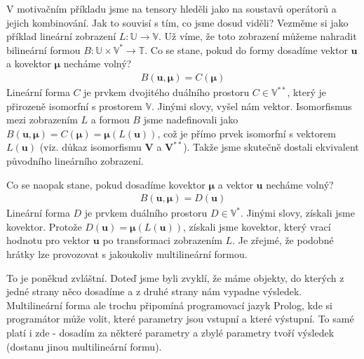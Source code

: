 \documentclass[a5paper,12pt]{amsbook}
\theoremstyle{definition}
\newcommand{\myvec}[1]{\bm{#1}}
\newcommand{\myspace}[1]{\mathbb{#1}}
\begin{document}
V motivačním příkladu jsme na tensory hleděli jako na soustavů operátorů a jejich
kombinování. Jak to souvisí s tím, co jsme dosud viděli? Vezměme si jako příklad
lineární zobrazení $L: \myspace{U}\rightarrow\myspace{V}$. Už víme, že toto zobrazení
můžeme nahradit bilineární formou $B: \myspace{U}\times\myspace{V^*}\rightarrow\myspace{T}$.
Co se stane, pokud do formy dosadíme vektor $\myvec{u}$ a kovektor $\myvec{\mu}$
necháme volný?
\begin{equation*}
\begin{split}
B(\myvec{u}, \myvec{\mu}) = C(\myvec{\mu})
\end{split}
\end{equation*}
Lineární forma $C$ je prvkem dvojitého duálního prostoru $C\in\myspace{V^{**}}$, který
je přirozeně isomorfní s prostorem $\myspace{V}$. Jinými slovy, vyšel nám vektor.
Isomorfismus mezi zobrazením $L$ a formou $B$ jsme nadefinovali jako
$B(\myvec{u}, \myvec{\mu}) = C(\myvec{\mu}) = \myvec{\mu}(L(\myvec{u}))$, což je přímo
prvek isomorfní s vektorem $L(\myvec{u})$ (viz. důkaz isomorfismu
$\myvec{V}$ a $\myvec{V^{**}}$). Takže jsme skutečně dostali ekvivalent původního
lineárního zobrazení.

Co se naopak stane, pokud dosadíme kovektor $\myvec{\mu}$ a vektor $\myvec{u}$ necháme
volný?
\begin{equation*}
\begin{split}
B(\myvec{u}, \myvec{\mu}) = D(\myvec{u})
\end{split}
\end{equation*}
Lineární forma $D$ je prvkem duálního prostoru $D\in\myspace{V^*}$. Jinými slovy,
získali jsme kovektor. Protože $D(\myvec{u}) = \myvec{\mu}(L(\myvec{u}))$,
získali jsme kovektor, který vrací hodnotu pro vektor $\myvec{u}$ po transformaci
zobrazením $L$. Je zřejmé, že podobné hrátky lze provozovat s jakoukoliv multilineární
formou.

To je poněkud zvláštní. Doteď jsme byli zvyklí, že máme objekty, do kterých z jedné
strany něco dosadíme a z druhé strany nám vypadne výsledek. Multilineární forma
ale trochu připomíná programovací jazyk Prolog, kde si programátor může volit,
které parametry jsou vstupní a které výstupní. To samé platí i zde - dosadím
za některé parametry a zbylé parametry tvoří výsledek (dostanu jinou multilineární
formu).
\end{document}
